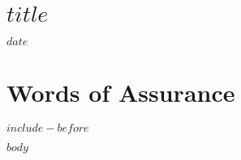 \documentclass[20pt]{extarticle}
\begin{document}
\section*{$title$}

$date$

\section{Words of Assurance}

$include-before$

$body$
\end{document}
